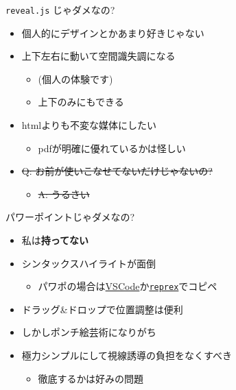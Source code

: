 \documentclass[
  12pt,
  ignorenonframetext,
]{beamer}
\providecommand{\tightlist}{%
  \setlength{\itemsep}{0pt}\setlength{\parskip}{0pt}}
\begin{document}
\begin{frame}{\texttt{reveal.js} じゃダメなの?}
\protect\hypertarget{reveal.js-ux3058ux3083ux30c0ux30e1ux306aux306e}{}

\begin{itemize}
\tightlist
\item
  個人的にデザインとかあまり好きじゃない
\item
  上下左右に動いて空間識失調になる

  \begin{itemize}
  \tightlist
  \item
    (個人の体験です)
  \item
    上下のみにもできる
  \end{itemize}
\item
  htmlよりも不変な媒体にしたい

  \begin{itemize}
  \tightlist
  \item
    pdfが明確に優れているかは怪しい
  \end{itemize}
\item
  \sout{Q: お前が使いこなせてないだけじゃないの?}

  \begin{itemize}
  \tightlist
  \item
    \sout{A: うるさい}
  \end{itemize}
\end{itemize}

\end{frame}

\begin{frame}[fragile]{パワーポイントじゃダメなの?}
\protect\hypertarget{ux30d1ux30efux30fcux30ddux30a4ux30f3ux30c8ux3058ux3083ux30c0ux30e1ux306aux306e}{}

\begin{itemize}
\tightlist
\item
  私は\textbf{持ってない}
\item
  シンタックスハイライトが面倒

  \begin{itemize}
  \tightlist
  \item
    パワポの場合は\href{https://notchained.hatenablog.com/entry/2017/02/20/221446}{VSCode}か\href{https://reprex.tidyverse.org/articles/articles/rtf.html}{\texttt{reprex}}でコピペ
  \end{itemize}
\item
  ドラッグ\&ドロップで位置調整は便利
\item
  しかしポンチ絵芸術になりがち
\item
  極力シンプルにして視線誘導の負担をなくすべき

  \begin{itemize}
  \tightlist
  \item
    徹底するかは好みの問題
  \end{itemize}
\end{itemize}

\end{frame}
\end{document}
